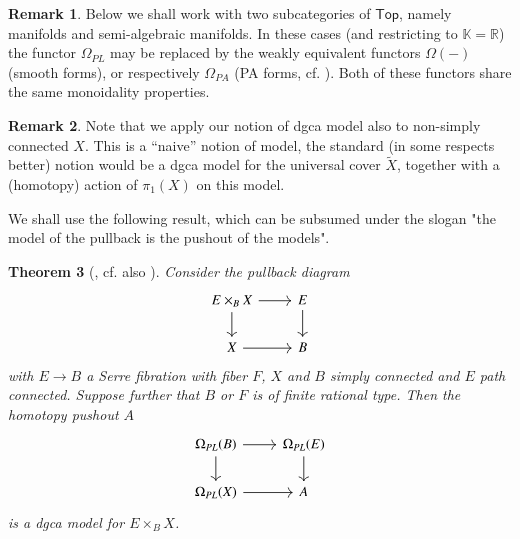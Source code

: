 \documentclass[a4paper]{amsart}
\theoremstyle{plain}
\newtheorem{thm}{Theorem}
\theoremstyle{definition}
\newtheorem{rem}[thm]{Remark}
\newcommand{\R}{{\mathbb{R}}}
\newcommand{\K}{{\mathbb{K}}}
\renewcommand{\Top}{\mathsf{Top}}
\begin{document}
\begin{rem}
 Below we shall work with two subcategories of $\Top$, namely manifolds and semi-algebraic manifolds. In these cases (and restricting to $\K=\R$) the functor $\Omega_{PL}$ may be replaced by the weakly equivalent functors $\Omega(-)$ (smooth forms), or respectively $\Omega_{PA}$ (PA forms, cf. \cite{HLTV}). Both of these functors share the same monoidality properties.
\end{rem}

\begin{rem}
 Note that we apply our notion of dgca model also to non-simply connected $X$. This is a ``naive'' notion of model, the standard (in some respects better) notion would be a dgca model for the universal cover $\tilde X$, together with a (homotopy) action of $\pi_1(X)$ on this model.
\end{rem}

We shall use the following result, which can be subsumed under the slogan "the model of the pullback is the pushout of the models".
\begin{thm}[{\cite[Proposition 15.8]{FHT}}, cf. also {\cite[Theorem 2.4]{HessRHT} }]\label{thm:from hess}
Consider the pullback diagram 
\[
\begin{tikzcd}
E\times_B X \ar{r}\ar{d} & E \ar{d} \\
X\ar {r} & B 
\end{tikzcd}
\]
with $E\to B$ a Serre fibration with fiber $F$, $X$ and $B$ simply connected and $E$ path connected. Suppose further that $B$ or $F$ is of finite rational type.
Then the homotopy pushout $A$
\[
\begin{tikzcd}
\Omega_{PL}(B)  \ar{r}\ar{d} & \Omega_{PL}(E) \ar{d} \\
\Omega_{PL}(X) \ar {r} & A 
\end{tikzcd}
\]
is a dgca model for $E\times_B X$.
\end{thm}
\end{document}
